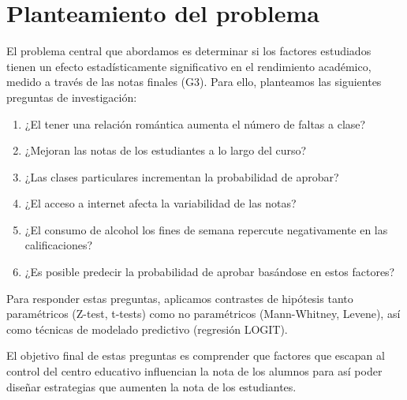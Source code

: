 \chapter{Planteamiento del problema}

El problema central que abordamos es determinar si los factores estudiados tienen un efecto estadísticamente significativo en el rendimiento académico, medido a través de las notas finales (G3). Para ello, planteamos las siguientes preguntas de investigación:

\begin{enumerate}
    \item ¿El tener una relación romántica aumenta el número de faltas a clase?

    \item ¿Mejoran las notas de los estudiantes a lo largo del curso?

    \item ¿Las clases particulares incrementan la probabilidad de aprobar?

    \item ¿El acceso a internet afecta la variabilidad de las notas?

    \item ¿El consumo de alcohol los fines de semana repercute negativamente en las calificaciones?

    \item ¿Es posible predecir la probabilidad de aprobar basándose en estos factores?
\end{enumerate}

Para responder estas preguntas, aplicamos contrastes de hipótesis tanto paramétricos (Z-test, t-tests) como no paramétricos (Mann-Whitney, Levene), así como técnicas de modelado predictivo (regresión LOGIT).

El objetivo final de estas preguntas es comprender que factores que escapan al control del centro educativo influencian la nota de los alumnos para así poder diseñar estrategias que aumenten la nota de los estudiantes.
